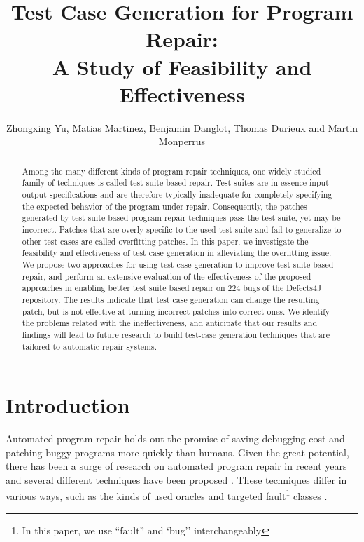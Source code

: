 \documentclass[]{sig-alternate}
\begin{document}
\title{Test Case Generation for Program Repair:\\ A Study of Feasibility and Effectiveness}

\author{Zhongxing Yu, Matias Martinez, Benjamin Danglot, Thomas Durieux and Martin Monperrus}

\maketitle

\begin{abstract}
Among the many different kinds of program repair techniques, one widely studied family of techniques is called test suite based repair.
Test-suites are in essence input-output specifications and are therefore typically inadequate for completely specifying the expected behavior of the program under repair.
Consequently, the patches generated by test suite based program repair techniques pass the test suite, yet may be incorrect. Patches that are overly specific to the used test suite and fail to generalize to other test cases are called overfitting patches.
In this paper, we investigate the feasibility and effectiveness of test case generation in alleviating the overfitting issue.
We propose two approaches for using test case generation to improve test suite based repair, and perform an extensive evaluation of the effectiveness of the proposed approaches in enabling better test suite based repair on 224 bugs of the Defects4J repository. The results indicate that test case generation can change the resulting patch, but is not effective at turning incorrect patches into correct ones. We identify the problems related with the ineffectiveness, and anticipate that our results and findings will lead to future research to build test-case generation techniques that are tailored to automatic repair systems.
\end{abstract}




\section{Introduction}

Automated program repair holds out the promise of saving debugging cost and patching buggy programs more quickly than humans. Given the great potential, there has been a surge of research on automated program repair in recent years and several different techniques have been proposed \cite{genprog,semfix,nopol,6776507}. These techniques differ in various ways, such as the kinds of used oracles and targeted fault\footnote{In this paper, we use ``fault'' and `bug'' interchangeably} classes \cite{Monperrus2015}.
\end{document}
